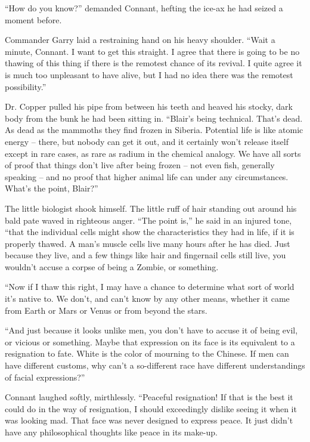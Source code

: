 \documentclass[letterpaper,openany,12pt]{memoir}		%
\begin{document}
``How do you know?'' demanded Connant, hefting the ice-ax he had seized a moment
before.

Commander Garry laid a restraining hand on his heavy shoulder. ``Wait a minute,
Connant. I want to get this straight. I agree that there is going to be no
thawing of this thing if there is the remotest chance of its revival. I quite
agree it is much too unpleasant to have alive, but I had no idea there was the
remotest possibility.''

Dr. Copper pulled his pipe from between his teeth and heaved his stocky, dark
body from the bunk he had been sitting in. ``Blair's being technical. That's
dead. As dead as the mammoths they find frozen in Siberia. Potential life is
like atomic energy -- there, but nobody can get it out, and it certainly won't
release itself except in rare cases, as rare as radium in the chemical analogy.
We have all sorts of proof that things don't live after being frozen -- not even
fish, generally speaking -- and no proof that higher animal life can under any
circumstances. What's the point, Blair?''

The little biologist shook himself. The little ruff of hair standing out around
his bald pate waved in righteous anger. ``The point is,'' he said in an injured
tone, ``that the individual cells might show the characteristics they had in
life, if it is properly thawed. A man's muscle cells live many hours after he
has died. Just because they live, and a few things like hair and fingernail
cells still live, you wouldn't accuse a corpse of being a Zombie, or something.

``Now if I thaw this right, I may have a chance to determine what sort of world
it's native to. We don't, and can't know by any other means, whether it came
from Earth or Mars or Venus or from beyond the stars.

``And just because it looks unlike men, you don't have to accuse it of being
evil, or vicious or something. Maybe that expression on its face is its
equivalent to a resignation to fate. White is the color of mourning to the
Chinese. If men can have different customs, why can't a so-different race have
different understandings of facial expressions?''

Connant laughed softly, mirthlessly. ``Peaceful resignation! If that is the best
it could do in the way of resignation, I should exceedingly dislike seeing it
when it was looking mad. That face was never designed to express peace. It just
didn't have any philosophical thoughts like peace in its make-up.
\end{document}
